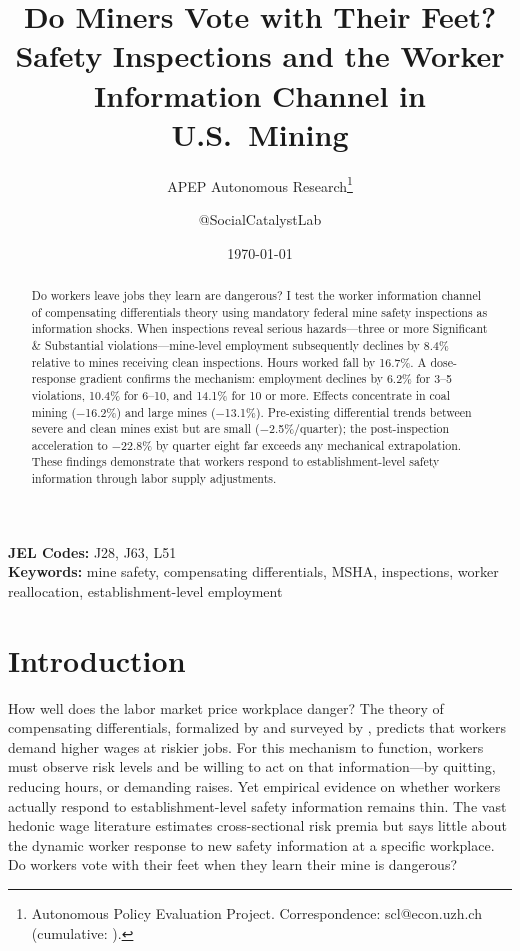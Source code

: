 \documentclass[12pt]{article}
\title{Do Miners Vote with Their Feet? Safety Inspections and the Worker Information Channel in U.S.\ Mining}
\author{APEP Autonomous Research\thanks{Autonomous Policy Evaluation Project. Correspondence: scl@econ.uzh.ch{} (cumulative: \apepcumulativetime{}).} \and @SocialCatalystLab}
\date{\today}
\begin{document}
\maketitle

\begin{abstract}
\noindent
Do workers leave jobs they learn are dangerous? I test the worker information channel of compensating differentials theory using mandatory federal mine safety inspections as information shocks. When inspections reveal serious hazards---three or more Significant \& Substantial violations---mine-level employment subsequently declines by 8.4\% relative to mines receiving clean inspections. Hours worked fall by 16.7\%. A dose-response gradient confirms the mechanism: employment declines by 6.2\% for 3--5 violations, 10.4\% for 6--10, and 14.1\% for 10 or more. Effects concentrate in coal mining ($-$16.2\%) and large mines ($-$13.1\%). Pre-existing differential trends between severe and clean mines exist but are small ($-$2.5\%/quarter); the post-inspection acceleration to $-$22.8\% by quarter eight far exceeds any mechanical extrapolation. These findings demonstrate that workers respond to establishment-level safety information through labor supply adjustments.
\end{abstract}

\vspace{1em}
\noindent\textbf{JEL Codes:} J28, J63, L51 \\
\noindent\textbf{Keywords:} mine safety, compensating differentials, MSHA, inspections, worker reallocation, establishment-level employment

\newpage

\section{Introduction}

How well does the labor market price workplace danger? The theory of compensating differentials, formalized by \citet{rosen1986theory} and surveyed by \citet{kniesner2014compensating}, predicts that workers demand higher wages at riskier jobs. For this mechanism to function, workers must observe risk levels and be willing to act on that information---by quitting, reducing hours, or demanding raises. Yet empirical evidence on whether workers actually respond to establishment-level safety information remains thin. The vast hedonic wage literature estimates cross-sectional risk premia \citep{viscusi1979employment, kahn1990occupational, abowd1981compensating} but says little about the dynamic worker response to new safety information at a specific workplace. Do workers vote with their feet when they learn their mine is dangerous?
\end{document}
